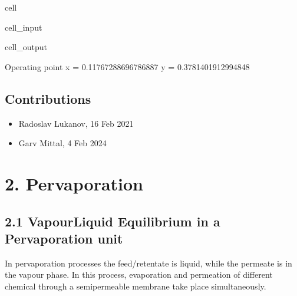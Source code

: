 \documentclass[letterpaper,10pt,english]{jupyterBook}
\begin{document}
\begin{sphinxuseclass}{cell}
\begin{sphinxVerbatimInput}
\begin{sphinxuseclass}{cell_input}
\end{sphinxuseclass}\end{sphinxVerbatimInput}
\begin{sphinxVerbatimOutput}

\begin{sphinxuseclass}{cell_output}
\begin{sphinxVerbatim}[commandchars=\\\{\}]
Operating point \PYGZhy{}\PYGZgt{} x =  0.11767288696786887  y =  0.3781401912994848
\end{sphinxVerbatim}

\noindent{}

\end{sphinxuseclass}\end{sphinxVerbatimOutput}

\end{sphinxuseclass}

\subsection{Contributions}
\label{\detokenize{Gas_permeation:contributions}}\begin{itemize}
\item {} 
\sphinxAtStartPar
Radoslav Lukanov, 16 Feb 2021

\item {} 
\sphinxAtStartPar
Garv Mittal, 4 Feb 2024

\end{itemize}

\sphinxstepscope


\section{2. Pervaporation}
\label{\detokenize{Pervaporation:pervaporation}}\label{\detokenize{Pervaporation::doc}}

\subsection{2.1 Vapour\sphinxhyphen{}Liquid Equilibrium in a Pervaporation unit}
\label{\detokenize{Pervaporation:vapour-liquid-equilibrium-in-a-pervaporation-unit}}
\sphinxAtStartPar
In pervaporation processes the feed/retentate is liquid, while the permeate is in the vapour phase.
In this process, evaporation and permeation of different chemical through a semipermeable membrane take place simultaneously.
\end{document}
